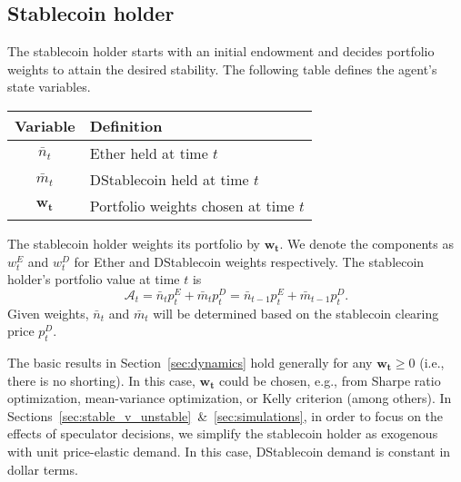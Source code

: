 \subsection{Stablecoin holder}
The stablecoin holder starts with an initial endowment and decides portfolio weights to attain the desired stability. The following table defines the agent's state variables.
\begin{center}
	\begin{tabular}{c|l}
		\textbf{Variable}	&	\textbf{Definition} \\
		\hline
		$\bar n_t$		&	Ether held at time $t$ \\
		$\bar m_t$		&	DStablecoin held at time $t$ \\
		$\mathbf{w_t}$			&	Portfolio weights chosen at time $t$
	\end{tabular}
\end{center}

The stablecoin holder weights its portfolio by $\mathbf{w_t}$. We denote the components as $w^E_t$ and $w^D_t$ for Ether and DStablecoin weights respectively. The stablecoin holder's portfolio value at time $t$ is
$$\mathcal{A}_t = \bar n_t p^E_t + \bar m_t p^D_t = \bar n_{t-1} p^E_t + \bar m_{t-1} p^D_t.$$
Given weights, $\bar n_t$ and $\bar m_t$ will be determined based on the stablecoin clearing price $p_t^D$.


The basic results in Section~\ref{sec:dynamics} hold generally for any $\mathbf{w_t}\geq 0$ (i.e., there is no shorting). In this case, $\mathbf{w_t}$ could be chosen, e.g., from Sharpe ratio optimization, mean-variance optimization, or Kelly criterion (among others). In Sections~\ref{sec:stable_v_unstable}~\&~\ref{sec:simulations}, in order to focus on the effects of speculator decisions, we simplify the stablecoin holder as exogenous with unit price-elastic demand. In this case, DStablecoin demand is constant in dollar terms.




